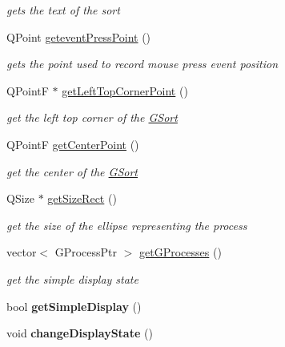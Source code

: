 \begin{DoxyCompactItemize}
\begin{DoxyCompactList}\small\item\em gets the text of the sort \end{DoxyCompactList}\item 
\hypertarget{classGSort_a71720b5ffb72f15a896637d572d97497}{Q\+Point \hyperlink{classGSort_a71720b5ffb72f15a896637d572d97497}{getevent\+Press\+Point} ()}\label{classGSort_a71720b5ffb72f15a896637d572d97497}

\begin{DoxyCompactList}\small\item\em gets the point used to record mouse press event position \end{DoxyCompactList}\item 
Q\+Point\+F $\ast$ \hyperlink{classGSort_ae795196b315650b96660693bcc7ce877}{get\+Left\+Top\+Corner\+Point} ()
\begin{DoxyCompactList}\small\item\em get the left top corner of the \hyperlink{classGSort}{G\+Sort} \end{DoxyCompactList}\item 
Q\+Point\+F \hyperlink{classGSort_aaa3431ebe3238fdf1d118a98316a0396}{get\+Center\+Point} ()
\begin{DoxyCompactList}\small\item\em get the center of the \hyperlink{classGSort}{G\+Sort} \end{DoxyCompactList}\item 
Q\+Size $\ast$ \hyperlink{classGSort_af38ef8c716b6566c862790a9039b38c4}{get\+Size\+Rect} ()
\begin{DoxyCompactList}\small\item\em get the size of the ellipse representing the process \end{DoxyCompactList}\item 
vector$<$ G\+Process\+Ptr $>$ \hyperlink{classGSort_acf62f4e6978631b1c714a74cdd0a156e}{get\+G\+Processes} ()
\begin{DoxyCompactList}\small\item\em get the simple display state \end{DoxyCompactList}\item 
\hypertarget{classGSort_a962c988b33337528415e98faca813bc1}{bool {\bfseries get\+Simple\+Display} ()}\label{classGSort_a962c988b33337528415e98faca813bc1}

\item 
\hypertarget{classGSort_ad2656e5a0ec4494845446839105a6a38}{void {\bfseries change\+Display\+State} ()}\label{classGSort_ad2656e5a0ec4494845446839105a6a38}


\end{DoxyCompactItemize}
